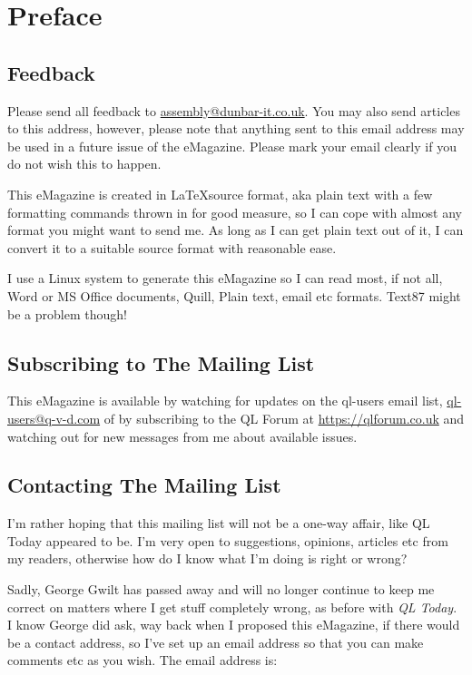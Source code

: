 \chapter{Preface}
\section{Feedback}\label{section: feedback}
Please send all feedback to \url{assembly@dunbar-it.co.uk}. You may also send articles to
this address, however, please note that anything sent to this email address may be used in a future issue of the eMagazine. Please mark your email clearly if you do not wish this to happen.

This eMagazine is created in \LaTeX  source format, aka plain text with a few formatting commands thrown in for good measure, so I can cope with almost any format you might want to send me. As long as I can get plain text out of it, I can convert it to a suitable source format with reasonable ease.

I use a Linux system to generate this eMagazine so I can read most, if not all, Word or MS Office documents, Quill, Plain text, email etc formats. Text87 might be a problem though!

\section{Subscribing to The Mailing List}
This eMagazine is available by watching for updates on the ql-users email list, \url{ql-users@q-v-d.com} of by subscribing to the QL Forum at \url{https://qlforum.co.uk} and watching out for new messages from me about available issues.

\section{Contacting The Mailing List}
I'm rather hoping that this mailing list will not be a one-way affair, like QL Today appeared to be. I'm very open to suggestions, opinions, articles etc from my readers, otherwise how do I know what I'm doing is right or wrong?

Sadly, George Gwilt has passed away and will no longer continue to keep me correct on matters where I get stuff completely wrong, as before with \emph{QL Today}. I know George did ask, way back when I proposed this eMagazine, if there would be a contact address, so I've set up an email address so that you can make comments etc as you wish. The email address is:

